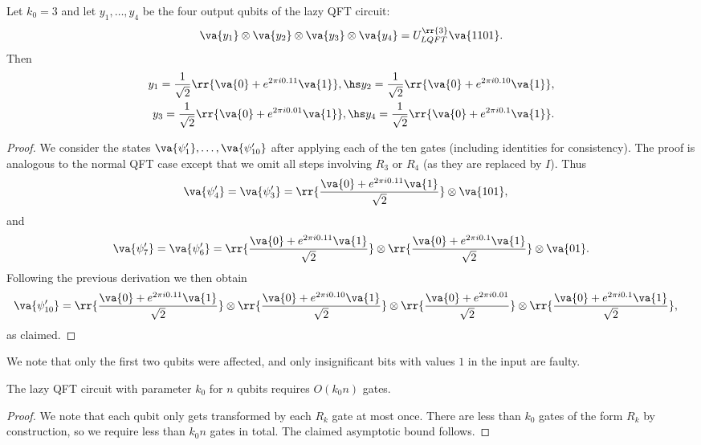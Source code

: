 \documentclass{article}
\begin{document}
\begin{claim*}[c]
  Let $k_0=3$ and let $y_1,\ldots,y_4$ be the four output qubits of the lazy QFT circuit:
  \begin{align*}
    \va{y_1}\otimes \va{y_2}\otimes \va{y_3}\otimes\va{y_4}=U^{\rr{3}}_{LQFT}\va{1101}.
  \end{align*}
  Then
  \begin{align*}
    y_1 = \frac{1}{\sqrt{2}} \rr{\va{0}+e^{2\pi i 0.11}\va{1}},\hs
    y_2 = \frac{1}{\sqrt{2}} \rr{\va{0}+e^{2\pi i 0.10}\va{1}},\\
    y_3 = \frac{1}{\sqrt{2}} \rr{\va{0}+e^{2\pi i 0.01}\va{1}},\hs
    y_4 = \frac{1}{\sqrt{2}} \rr{\va{0}+e^{2\pi i 0.1}\va{1}}.
  \end{align*}
  \begin{proof}
    We consider the states $\va{\psi'_1},\ldots,\va{\psi'_{10}}$ after applying each of the
    ten gates (including identities for consistency).
    The proof is analogous to the normal QFT case except that we omit all
    steps involving $R_3$ or $R_4$ (as they are replaced by $I$). Thus
    \begin{align*}
      \va{\psi'_4} = \va{\psi'_3} &=\rr{\frac{\va{0}+e^{2\pi i 0.11}\va{1}}{\sqrt{2}}}\otimes\va{101},
    \end{align*}
    and
    \begin{align*}
      \va{\psi'_7} = \va{\psi'_6} = \rr{\frac{\va{0}+e^{2\pi i 0.11}\va{1}}{\sqrt{2}}}
      \otimes \rr{\frac{\va{0}+e^{2\pi i 0.1}\va{1}}{\sqrt{2}}}
      \otimes \va{01}.
    \end{align*}
    Following the previous derivation we then obtain
    \begin{align*}
      \va{\psi'_{10}}
      &= \rr{\frac{\va{0}+e^{2\pi i 0.11}\va{1}}{\sqrt{2}}}
      \otimes \rr{\frac{\va{0}+e^{2\pi i 0.10}\va{1}}{\sqrt{2}}}
      \otimes \rr{\frac{\va{0}+e^{2\pi i 0.01}}{\sqrt{2}}}
      \otimes \rr{\frac{\va{0}+e^{2\pi i 0.1}\va{1}}{\sqrt{2}}},
    \end{align*}
    as claimed.
  \end{proof}
\end{claim*}

We note that only the first two qubits were affected, and only insignificant bits
with values $1$ in the input are faulty.

\begin{claim*}
  The lazy QFT circuit with parameter $k_0$ for $n$ qubits requires $O(k_0 n)$ gates.
  \begin{proof}
    We note that each qubit only gets transformed by each $R_k$ gate at most once.
    There are less than $k_0$ gates of the form $R_k$ by construction, so
    we require less than $k_0 n$ gates in total. The claimed asymptotic bound follows.
  \end{proof}
\end{claim*}
\end{document}

